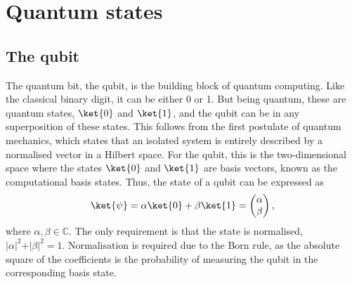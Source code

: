 \section{Quantum states}
\subsection{The qubit}
The quantum bit, the qubit, is the building block of quantum computing.
Like the classical binary digit, it can be either 0 or 1.
But being quantum, these are quantum states, $\ket{0}$ and $\ket{1}$\footnotemark{}, and the qubit can be in any superposition of these states.
This follows from the first postulate of quantum mechanics\footnotemark, which states that an isolated system is entirely described by a normalised vector in a Hilbert space.
For the qubit, this is the two-dimensional space where the states $\ket{0}$ and $\ket{1}$ are basis vectors, known as the computational basis states.
Thus, the state of a qubit can be expressed as
\begin{equation}
    \ket{\psi} = \alpha \ket{0} + \beta \ket{1} = \begin{pmatrix} \alpha \\ \beta \end{pmatrix},
    \label{eq:qubit}
\end{equation}
where $\alpha, \beta \in \mathbb{C}$.
The only requirement is that the state is normalised, $\vert\alpha\vert^2 + \vert\beta\vert^2 = 1$.
Normalisation is required due to the Born rule, as the absolute square of the coefficients is the probability of measuring the qubit in the corresponding basis state.

